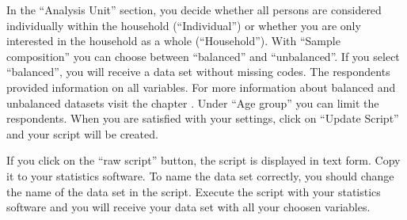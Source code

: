 \documentclass[letterpaper,10pt,openany,onesideH,english]{sphinxmanual}
\begin{document}
\begin{figure}[H]
\centering

\noindent{}
\end{figure}

In the “Analysis Unit” section, you decide whether all persons are considered individually within the household (“Individual”) or whether you are only interested in the household as a whole (“Household”). With “Sample composition” you can choose between “balanced” and “unbalanced”. If you select “balanced”, you will receive a data set without missing codes. The respondents provided information on all variables. For more information about balanced and unbalanced datasets visit the chapter {\hyperref[\detokenize{Principles of Data Structure/index:analysis}]{}}. Under “Age group” you can limit the respondents. When you are satisfied with your settings, click on “Update Script” and your script will be created.

\begin{figure}[H]
\centering

\noindent{}
\end{figure}

If you click on the “raw script” button, the script is displayed in text form. Copy it to your statistics software. To name the data set correctly, you should change the name of the data set in the script. Execute the script with your statistics software and you will receive your data set with all your choosen variables.



\renewcommand{\indexname}{Index}
\printindex
\end{document}
